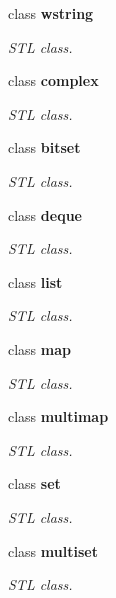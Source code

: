 \begin{DoxyCompactItemize}
class {\bfseries wstring}
\begin{DoxyCompactList}\small\item\em STL class. \item\end{DoxyCompactList}\item 
class {\bfseries complex}
\begin{DoxyCompactList}\small\item\em STL class. \item\end{DoxyCompactList}\item 
class {\bfseries bitset}
\begin{DoxyCompactList}\small\item\em STL class. \item\end{DoxyCompactList}\item 
class {\bfseries deque}
\begin{DoxyCompactList}\small\item\em STL class. \item\end{DoxyCompactList}\item 
class {\bfseries list}
\begin{DoxyCompactList}\small\item\em STL class. \item\end{DoxyCompactList}\item 
class {\bfseries map}
\begin{DoxyCompactList}\small\item\em STL class. \item\end{DoxyCompactList}\item 
class {\bfseries multimap}
\begin{DoxyCompactList}\small\item\em STL class. \item\end{DoxyCompactList}\item 
class {\bfseries set}
\begin{DoxyCompactList}\small\item\em STL class. \item\end{DoxyCompactList}\item 
class {\bfseries multiset}
\begin{DoxyCompactList}\small\item\em STL class. \item\end{DoxyCompactList}\item 

\end{DoxyCompactItemize}
